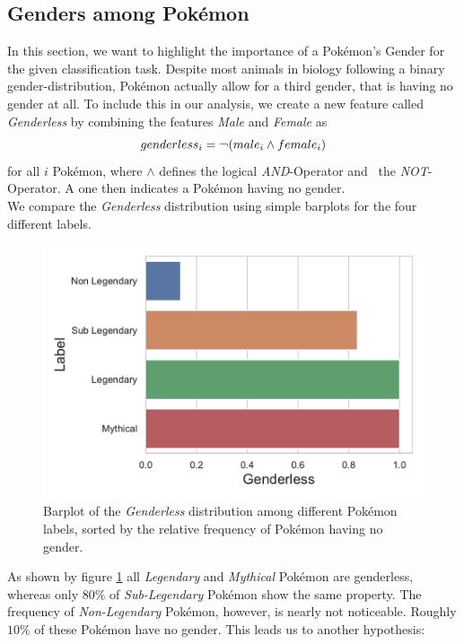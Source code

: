 \documentclass[conference]{IEEEtran}
\begin{document}
\subsection{Genders among Pokémon}
In this section, we want to highlight the importance of a Pokémon's Gender for the given classification task. Despite most animals in biology following a binary gender-distribution, Pokémon actually allow for a third gender, that is having no gender at all. To include this in our analysis, we create a new feature called \textit{Genderless} by combining the features \textit{Male} and \textit{Female} as
\begin{equation}
	genderless_i = \text{\textlnot} (male_i \wedge female_i)
\end{equation}
for all $i$ Pokémon, where $\wedge$ defines the logical \textit{AND}-Operator and \textlnot \ the \textit{NOT}-Operator. A one then indicates a Pokémon having no gender.\\
We compare the \textit{Genderless} distribution using simple barplots for the four different labels.\\
\begin{figure}
	\includegraphics[width=\columnwidth]{../../figures/bar_genderless.pdf}
	\centering
	\caption{Barplot of the \textit{Genderless} distribution among different Pokémon labels, sorted by the relative frequency of Pokémon having no gender.}
	\label{fig:genderless}
\end{figure}
As shown by figure \ref{fig:genderless} all \textit{Legendary} and \textit{Mythical} Pokémon are genderless, whereas only $80\%$ of \textit{Sub-Legendary} Pokémon show the same property. The frequency of \textit{Non-Legendary} Pokémon, however, is nearly not noticeable. Roughly $10\%$ of these Pokémon have no gender. This leads us to another hypothesis:
\end{document}
